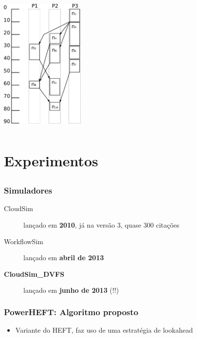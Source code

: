 \documentclass{beamer}
\newcommand{\colorize}[2]{\textbf{\textcolor{#1}{#2}}}
\begin{document}
\begin{frame}
\begin{columns}[c]
	\begin{column}[c]{.4\textwidth} %
		\includegraphics[height=6.5cm]{escalonamento_heft.pdf}
	\end{column}
\end{columns}
\end{frame}



\section{Experimentos}
\subsection{}

\begin{frame}
\frametitle{Simuladores}
\begin{description}
	\item[CloudSim] lançado em \colorize{n_violet}{2010}, já na versão 3, quase 300 citações
	\item[WorkflowSim] lançado em \colorize{n_green}{abril de 2013}
	\item[\textbf{CloudSim\_DVFS}] lançado em \colorize{n_red}{junho de 2013} (!!)
\end{description}

\end{frame}

\begin{frame}
\frametitle{PowerHEFT: Algoritmo proposto}
\begin{itemize}
	\item Variante do HEFT, faz uso de uma estratégia de lookahead
\end{itemize}

\end{frame}
\end{document}
